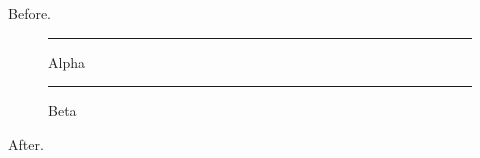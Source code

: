\documentclass{beamer}
\begin{document}
\begin{frame}[plain,t]
Before.\begin{figure}\rule{40pt}{10pt}\caption{Alpha}\end{figure}\begin{figure}\rule{20pt}{12pt}\caption{Beta}\end{figure}After.
\end{frame}
\end{document}
